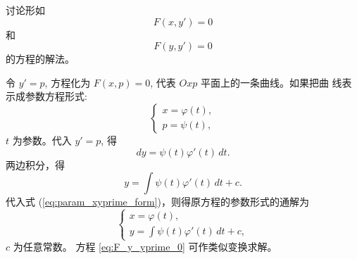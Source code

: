 \begin{example}
    讨论形如
\begin{equation}
F(x,y')=0 \label{eq:F_x_yprime_0}
\end{equation}
和
\begin{equation}
F(y,y')=0 \label{eq:F_y_yprime_0}
\end{equation}的方程的解法。
\end{example}
\begin{solution}
    令 $y'=p$, 方程化为 $F(x,p)=0$, 代表 $Oxp$ 平面上的一条曲线。如果把曲
线表示成参数方程形式:
\begin{equation}
\begin{cases} x=\varphi(t), \\ p=\psi(t), \end{cases} \label{eq:param_xyprime_form}
\end{equation}
$t$ 为参数。代入 $y'=p$, 得
$$dy=\psi(t)\varphi'(t)\,dt.$$
两边积分，得
$$y=\int \psi(t)\varphi'(t)\,dt + c.$$
代入式 (\ref{eq:param_xyprime_form})，则得原方程的参数形式的通解为
\begin{equation}
\begin{cases} x=\varphi(t), \\ y=\int \psi(t)\varphi'(t)\,dt + c, \end{cases} \label{eq:param_solution_form}
\end{equation}
$c$ 为任意常数。
方程 \eqref{eq:F_y_yprime_0} 可作类似变换求解。
\end{solution}
